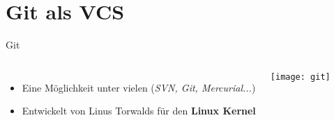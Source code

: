 \documentclass[aspectratio=169]{beamer}
\begin{document}
  \section{Git als VCS}

  \begin{frame}{Git}
    \begin{columns}
        \begin{itemize}
          \item Eine Möglichkeit unter vielen (\textit{SVN, Git, Mercurial...})
          \item Entwickelt von Linus Torwalds für den \textbf{Linux Kernel}
        \end{itemize}
        \texttt{[image: git]}
    \end{columns}
  \end{frame}
\end{document}
